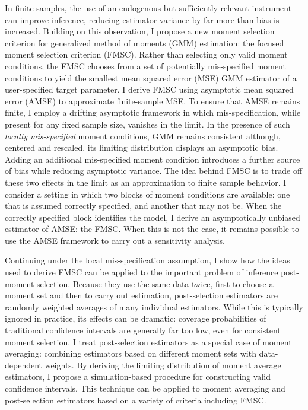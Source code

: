 \documentclass[12pt]{article}
\theoremstyle{definition}
\begin{document}
In finite samples, the use of an endogenous but sufficiently relevant instrument can improve inference, reducing estimator variance by far more than bias is increased. Building on this observation, I propose a new moment selection criterion for generalized method of moments (GMM) estimation: the focused moment selection criterion (FMSC). Rather than selecting only valid moment conditions, the FMSC chooses from a set of potentially mis-specified moment conditions to yield the smallest mean squared error (MSE) GMM estimator of a user-specified target parameter. I derive FMSC using asymptotic mean squared error (AMSE) to approximate finite-sample MSE. To ensure that AMSE remains finite, I employ a drifting asymptotic framework in which mis-specification, while present for any fixed sample size, vanishes in the limit. In the presence of such \emph{locally mis-specified} moment conditions, GMM remains consistent although, centered and rescaled, its limiting distribution displays an asymptotic bias. Adding an additional mis-specified moment condition introduces a further source of bias while reducing asymptotic variance. The idea behind FMSC is to trade off these two effects in the limit as an approximation to finite sample behavior. %
I consider a setting in which two blocks of moment conditions are available: one that is assumed correctly specified, and another that may not be. When the correctly specified block identifies the model, I derive an asymptotically unbiased estimator of AMSE: the FMSC. When this is not the case, it remains possible to use the AMSE framework to carry out a sensitivity analysis. 

Continuing under the local mis-specification assumption, I show how the ideas used to derive FMSC can be applied to the important problem of inference post-moment selection. Because they use the same data twice, first to choose a moment set and then to carry out estimation, post-selection estimators are randomly weighted averages of many individual estimators. While this is typically ignored in practice, its effects can be dramatic: coverage probabilities of traditional confidence intervals are generally far too low, even for consistent moment selection. I treat post-selection estimators as a special case of moment averaging: combining estimators based on different moment sets with data-dependent weights. By deriving the limiting distribution of moment average estimators, I propose a simulation-based procedure for constructing valid confidence intervals. This technique can be applied to moment averaging and post-selection estimators based on a variety of criteria including FMSC. 
\end{document}
